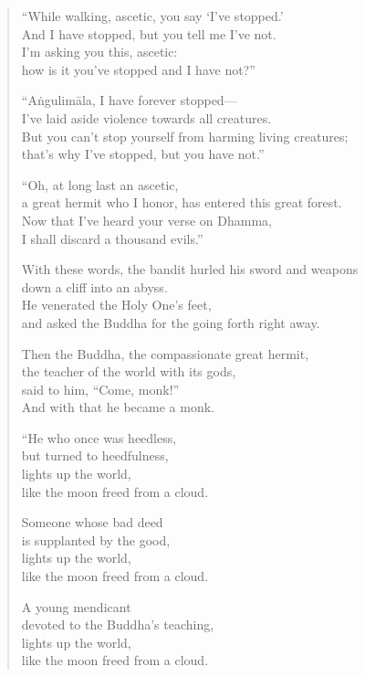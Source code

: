 \documentclass[12pt,openany]{book}%
\begin{document}
\begin{verse}%
“While walking, ascetic, you say ‘I’ve stopped.’ \\
And I have stopped, but you tell me I’ve not. \\
I’m asking you this, ascetic: \\
how is it you’ve stopped and I have not?” 

“\textsanskrit{Aṅgulimāla}, I have forever stopped—\\
I’ve laid aside violence towards all creatures. \\
But you can’t stop yourself from harming living creatures; \\
that’s why I’ve stopped, but you have not.” 

“Oh, at long last an ascetic, \\
a great hermit who I honor, has entered this great forest. \\
Now that I’ve heard your verse on Dhamma, \\
I shall discard a thousand evils.” 

With these words, the bandit hurled his sword and weapons \\
down a cliff into an abyss. \\
He venerated the Holy One’s feet, \\
and asked the Buddha for the going forth right away. 

Then the Buddha, the compassionate great hermit, \\
the teacher of the world with its gods, \\
said to him, “Come, monk!” \\
And with that he became a monk. 

“He who once was heedless, \\
but turned to heedfulness, \\
lights up the world, \\
like the moon freed from a cloud. 

Someone whose bad deed \\
is supplanted by the good, \\
lights up the world, \\
like the moon freed from a cloud. 

A young mendicant \\
devoted to the Buddha’s teaching, \\
lights up the world, \\
like the moon freed from a cloud. 


\end{verse}
\end{document}
